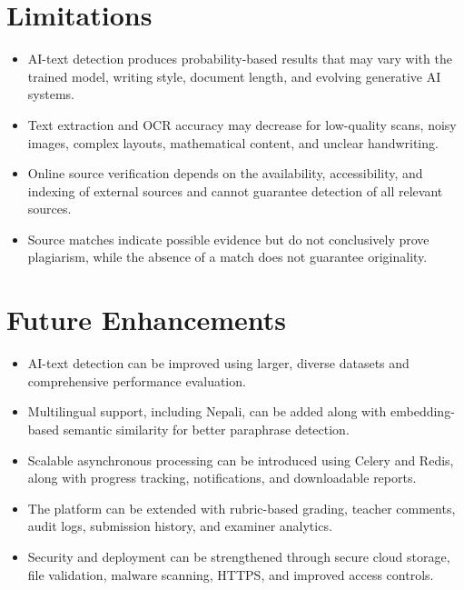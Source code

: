 \documentclass[12pt, a4paper]{report}
\numberwithin{equation}{chapter}
\begin{document}
\section{Limitations}

\begin{itemize}
\item AI-text detection produces probability-based results that may vary with the trained model, writing style, document length, and evolving generative AI systems.

\item Text extraction and OCR accuracy may decrease for low-quality scans, noisy images, complex layouts, mathematical content, and unclear handwriting.

\item Online source verification depends on the availability, accessibility, and indexing of external sources and cannot guarantee detection of all relevant sources.

\item Source matches indicate possible evidence but do not conclusively prove plagiarism, while the absence of a match does not guarantee originality.
\end{itemize}
\section{Future Enhancements}
\begin{itemize}

\item AI-text detection can be improved using larger, diverse datasets and comprehensive performance evaluation.

\item Multilingual support, including Nepali, can be added along with embedding-based semantic similarity for better paraphrase detection.

\item Scalable asynchronous processing can be introduced using Celery and Redis, along with progress tracking, notifications, and downloadable reports.

\item The platform can be extended with rubric-based grading, teacher comments, audit logs, submission history, and examiner analytics.

\item Security and deployment can be strengthened through secure cloud storage, file validation, malware scanning, HTTPS, and improved access controls.

\end{itemize}
\end{document}
